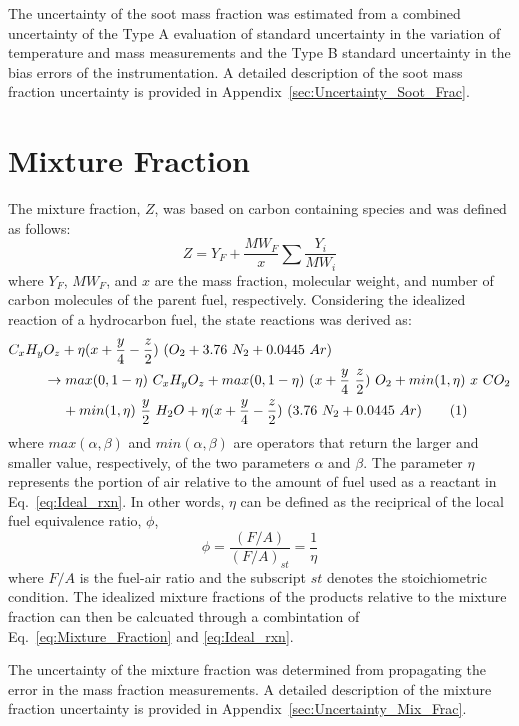 \documentclass[12pt]{article}
\newcommand\numberthis{\addtocounter{equation}{1}\tag{\theequation}}
\begin{document}
The uncertainty of the soot mass fraction was estimated from a combined uncertainty of the Type A evaluation of standard uncertainty in the variation of temperature and mass measurements and the Type B standard uncertainty in the bias errors of the instrumentation. A detailed description of the soot mass fraction uncertainty is provided in Appendix~\ref{sec:Uncertainty_Soot_Frac}.

\section{Mixture Fraction}
\label{sec:Mixture_Fraction}
The mixture fraction, $Z$, was based on carbon containing species and was defined as follows:
\begin{equation}\label{eq:Mixture_Fraction}
Z=Y_{F}+\frac{{MW_{F}}}{x}\sum{\frac{Y_{i}}{{MW_{i}}}}
\end{equation} 
where $Y_{F}$, ${MW_{F}}$, and $x$ are the mass fraction, molecular weight, and number of carbon molecules of the parent fuel, respectively. Considering the idealized reaction of a hydrocarbon fuel, the state reactions was derived as:
\begin{align*}
C_{x}H_{y}&O_{z}+\eta(x+\frac{y}{4}-\frac{z}{2})~(O_{2}+3.76~N_{2}+0.0445~Ar)\\
&\rightarrow max(0,1-\eta)~C_{x}H_{y}O_{z}+max(0,1-\eta)~(x+\frac{y}{4}~\frac{z}{2})~O_{2}+ min(1,\eta)~x~CO_{2}\\ 
&~~~~+min(1,\eta)~\frac{y}{2}~H_{2}O+\eta(x+\frac{y}{4}-\frac{z}{2})~(3.76~N_{2}+0.0445~Ar) \numberthis \label{eq:Ideal_rxn}
\end{align*}
where $max(\alpha,\beta)$ and $min(\alpha,\beta)$ are operators that return the larger and smaller value, respectively, of the two parameters $\alpha$ and $\beta$. The parameter $\eta$ represents the portion of air relative to the amount of fuel used as a reactant in Eq.~\ref{eq:Ideal_rxn}. In other words, $\eta$ can be defined as the reciprical of the local fuel equivalence ratio, $\phi$,
\begin{equation}\label{eq:Eta}
\phi=\frac{(F/A)}{(F/A)_{st}}=\frac{1}{\eta}
\end{equation} 
where $F/A$ is the fuel-air ratio and the subscript $st$ denotes the stoichiometric condition. The idealized mixture fractions of the products relative to the mixture fraction can then be calcuated through a combintation of Eq.~\ref{eq:Mixture_Fraction} and \ref{eq:Ideal_rxn}. 

The uncertainty of the mixture fraction was determined from propagating the error in the mass fraction measurements. A detailed description of the mixture fraction uncertainty is provided in Appendix~\ref{sec:Uncertainty_Mix_Frac}. 
\end{document}
